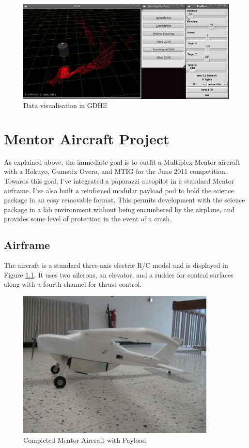 \documentclass[a4paper,11pt]{report}
\begin{document}
\begin{figure}[ht]
 \centering
 \includegraphics[width=12cm]{Hoku2gdhe.png}
 \caption{Data visualisation in GDHE}
 \label{fig:hoku2gdhe}
\end{figure}


\chapter{Mentor Aircraft Project}
\label{sec:mentorproject}

As explained above, the immediate goal is to outfit a Multiplex Mentor aircraft with a Hokuyo, Gumstix Overo, and MTIG for the June 2011 competition. Towards this goal, I've integrated a paparazzi autopilot in a standard Mentor airframe. I've also built a reinforced modular payload pod to hold the science package in an easy removable format. This permits development with the science package in a lab environment without being encumbered by the airplane, and provides some level of protection in the event of a crash.

\section{Airframe}

The aircraft is a standard three-axis electric R/C model and is displayed in Figure \ref{fig:mentor}. It uses two ailerons, an elevator, and a rudder for control surfaces along with a fourth channel for thrust control.

\begin{figure}[ht]
 \centering
 \includegraphics[width=10cm]{800px-Mentor1_2.jpg}
 \caption{Completed Mentor Aircraft with Payload}
 \label{fig:mentor}
\end{figure}
\end{document}
